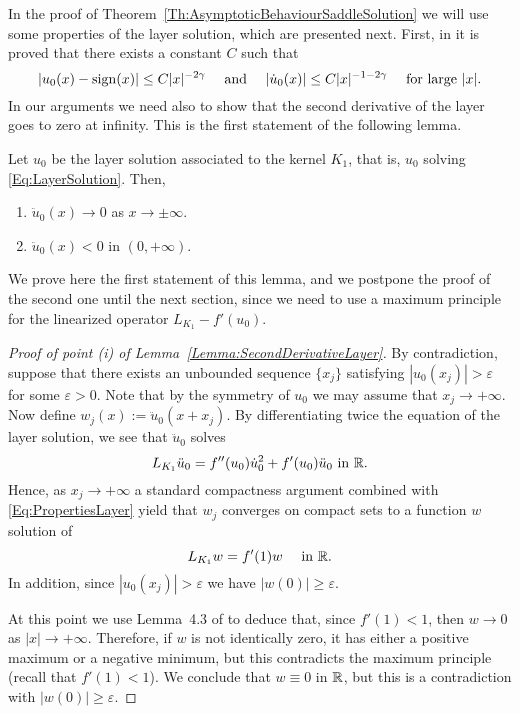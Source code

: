 In the proof of Theorem~\ref{Th:AsymptoticBehaviourSaddleSolution} we will use some properties of the layer solution, which are presented next. First, in \cite{CozziPassalacqua} it is proved that there exists a constant $C$ such that
\begin{equation}
	\label{Eq:PropertiesLayer}
	|u_0 (x)-\operatorname{sign}(x)| \leq C |x|^{-2\gamma}  \quad \text{ and } \quad |\dot{u}_0 (x)| \leq C |x|^{-1-2\gamma}  \quad \text{ for large }|x|.
\end{equation}
In our arguments we need also to show that the second derivative of the layer goes to zero at infinity. This is the first statement of the following lemma.

\begin{lemma}
	\label{Lemma:SecondDerivativeLayer}
	Let $u_0$ be the layer solution associated to the kernel $K_1$, that is, $u_0$ solving \eqref{Eq:LayerSolution}. Then, 
	\begin{enumerate}[label=(\roman{*})]
		\item $\ddot{u}_0 (x) \to 0$ as $x\to \pm \infty$.	
		\item  $\ddot{u}_0 (x) < 0$ in $(0,+\infty)$.
	\end{enumerate}
\end{lemma}

We prove here the first statement of this lemma, and we postpone the proof of the second one until the next section, since we need to use a maximum principle for the linearized operator $L_{K_1} - f'(u_0)$.

\begin{proof}[Proof of point (i) of Lemma~\ref{Lemma:SecondDerivativeLayer}]
	By contradiction, suppose that there exists an unbounded sequence $\{x_j\}$ satisfying $|u_0(x_j)|>\varepsilon$ for some $\varepsilon>0$. Note that by the symmetry of $u_0$ we may assume that $x_j\to + \infty$. Now define $w_j (x) := \ddot{u}_0(x+x_j)$. By differentiating twice the equation of the layer solution, we see that $\ddot{u}_0$ solves
	$$
	L_{K_1} \ddot{u}_0 = f''(u_0)\dot{u}_0^2 + f'(u_0)\ddot{u}_0 \text{ in }\mathbb{R}.
	$$
	Hence, as $x_j \to +\infty$ a standard compactness argument combined with \eqref{Eq:PropertiesLayer} yield that $w_j$ converges on compact sets to a function $w$ solution of
	$$
	L_{K_1}  w = f'(1)w \quad \text{ in }\mathbb{R}.
	$$
	In addition, since $|u_0(x_j)|>\varepsilon$ we have $|w(0)|\geq \varepsilon$.
	
	At this point we use Lemma~4.3 of \cite{CozziPassalacqua} to deduce that, since $f'(1)<1$, then $w\to 0$ as $|x| \to +\infty$. Therefore, if $w$ is not identically zero, it has either a positive maximum or a negative minimum, but this contradicts the maximum principle (recall that $f'(1)<1$). We conclude that $w\equiv0$ in $\mathbb{R}$, but this is a contradiction with $|w(0)|\geq \varepsilon$.
\end{proof}




